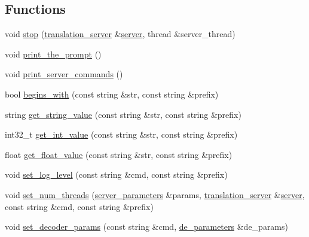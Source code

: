 \subsection*{Functions}
\begin{DoxyCompactItemize}
\item 
void \hyperlink{namespaceuva_1_1smt_1_1bpbd_1_1server_a7d9e43711d1695901561d85ad78c52ef}{stop} (\hyperlink{classuva_1_1smt_1_1bpbd_1_1server_1_1translation__server}{translation\+\_\+server} \&\hyperlink{classwebsocketpp_1_1server}{server}, thread \&server\+\_\+thread)
\item 
void \hyperlink{namespaceuva_1_1smt_1_1bpbd_1_1server_a4801856928dba67cacf60a5073b27b62}{print\+\_\+the\+\_\+prompt} ()
\item 
void \hyperlink{namespaceuva_1_1smt_1_1bpbd_1_1server_aeb4d06a599928c221d900e7a630414a0}{print\+\_\+server\+\_\+commands} ()
\item 
bool \hyperlink{namespaceuva_1_1smt_1_1bpbd_1_1server_af54c3a6ef0c3b7ef3c01ec359b4e2d43}{begins\+\_\+with} (const string \&str, const string \&prefix)
\item 
string \hyperlink{namespaceuva_1_1smt_1_1bpbd_1_1server_a2b51ccfeb175ba10143e2466d590306c}{get\+\_\+string\+\_\+value} (const string \&str, const string \&prefix)
\item 
int32\+\_\+t \hyperlink{namespaceuva_1_1smt_1_1bpbd_1_1server_a86c43879f19a20574c39b0414db1fe8d}{get\+\_\+int\+\_\+value} (const string \&str, const string \&prefix)
\item 
float \hyperlink{namespaceuva_1_1smt_1_1bpbd_1_1server_a6520b534357e7c5fddc717e45de2f61f}{get\+\_\+float\+\_\+value} (const string \&str, const string \&prefix)
\item 
void \hyperlink{namespaceuva_1_1smt_1_1bpbd_1_1server_a7607f243d5aee3158f017c678e74efd2}{set\+\_\+log\+\_\+level} (const string \&cmd, const string \&prefix)
\item 
void \hyperlink{namespaceuva_1_1smt_1_1bpbd_1_1server_a54e62e40e91cc1e29f19e15251a493ae}{set\+\_\+num\+\_\+threads} (\hyperlink{structuva_1_1smt_1_1bpbd_1_1server_1_1server__parameters}{server\+\_\+parameters} \&params, \hyperlink{classuva_1_1smt_1_1bpbd_1_1server_1_1translation__server}{translation\+\_\+server} \&\hyperlink{classwebsocketpp_1_1server}{server}, const string \&cmd, const string \&prefix)
\item 
void \hyperlink{namespaceuva_1_1smt_1_1bpbd_1_1server_a58e963f12403043ba7c2a5bf6e69340a}{set\+\_\+decoder\+\_\+params} (const string \&cmd, \hyperlink{namespaceuva_1_1smt_1_1bpbd_1_1server_1_1decoder_aaf4d5faf3a48156401c854d163d4b848}{de\+\_\+parameters} \&de\+\_\+params)

\end{DoxyCompactItemize}
